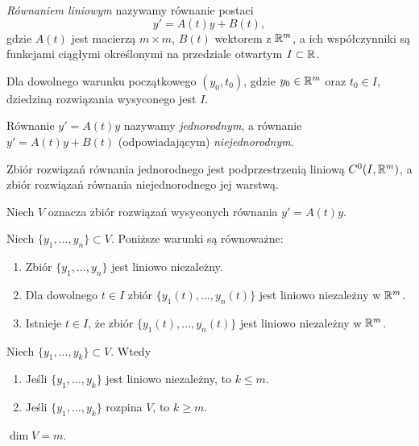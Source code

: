 %
\begin{definition}
  \emph{Równaniem liniowym} nazywamy równanie postaci
%
  \begin{equation*}
    y' = A(t)y + B(t),
  \end{equation*}
%
  gdzie $A(t)$ jest macierzą $m \times m$, $B(t)$ wektorem z $\mathbb{R}^m$, a ich współczynniki są funkcjami ciągłymi 
  określonymi na przedziale otwartym $I \subset \mathbb{R}$.
\end{definition}
%
\begin{lemma}
  Dla dowolnego warunku początkowego $(y_0,t_0)$, gdzie $y_0 \in \mathbb{R}^m$ oraz $t_0 \in I$, dziedziną rozwiązania 
  wysyconego jest $I$.
\end{lemma}
%
\begin{definition}
  Równanie $y' = A(t)y$ nazywamy \emph{jednorodnym}, a równanie $y' = A(t)y + B(t)$ (odpowiadającym) 
  \emph{niejednorodnym}.
\end{definition}
%
\begin{theorem}
  Zbiór rozwiązań równania jednorodnego jest podprzestrzenią liniową $C^0(I,\mathbb{R}^m)$, a zbiór rozwiązań równania 
  niejednorodnego jej warstwą.
\end{theorem}
%
Niech $V$ oznacza zbiór rozwiązań wysyconych równania $y' = A(t)y$.
%
\begin{statement}
  Niech $\{y_1, \ldots, y_n\} \subset V$. Poniższe warunki są równoważne:
%
  \begin{enumerate}
    \item Zbiór $\{y_1, \ldots, y_n\}$ jest liniowo niezależny.
    \item Dla dowolnego $t \in I$ zbiór $\big\{y_1(t), \ldots, y_n(t)\big\}$ jest liniowo niezależny w $\mathbb{R}^m$.
    \item Istnieje $t \in I$, że zbiór $\big\{y_1(t), \ldots, y_n(t)\big\}$ jest liniowo niezależny w $\mathbb{R}^m$.
  \end{enumerate}
\end{statement}
%
\begin{statement}
  Niech $\{y_1, \ldots, y_k\} \subset V$. Wtedy
%
  \begin{enumerate}
    \item Jeśli $\{y_1, \ldots, y_k\}$ jest liniowo niezależny, to $k \leq m$.
    \item Jeśli $\{y_1, \ldots, y_k\}$ rozpina $V$, to $k \geq m$.
  \end{enumerate}
\end{statement}
%
\begin{conclusion}
  $\dim V = m$.
\end{conclusion}
